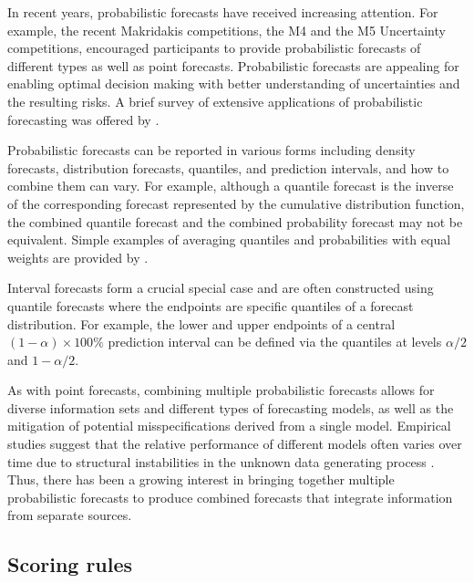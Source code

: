 \documentclass[a4paper,11pt]{article}
\begin{document}
In recent years, probabilistic forecasts have received increasing attention. For example, the recent Makridakis competitions, the M4 and the M5 Uncertainty \citep{Makridakis2020-lz} competitions, encouraged participants to provide probabilistic forecasts of different types as well as point forecasts. Probabilistic forecasts are appealing for enabling optimal decision making with better understanding of uncertainties and the resulting risks. A brief survey of extensive applications of probabilistic forecasting was offered by \citet{Gneiting2014-tz}.

Probabilistic forecasts can be reported in various forms including density forecasts, distribution forecasts, quantiles, and prediction intervals, and how to combine them can vary. For example, although a quantile forecast is the inverse of the corresponding forecast represented by the cumulative distribution function, the combined quantile forecast and the combined probability forecast may not be equivalent. Simple examples of averaging quantiles and probabilities with equal weights are provided by \citet{Lichtendahl2013-rt}.

Interval forecasts form a crucial special case and are often constructed using quantile forecasts where the endpoints are specific quantiles of a forecast distribution. For example, the lower and upper endpoints of a central $(1-\alpha)\times 100\%$ prediction interval can be defined via the quantiles at levels $\alpha/2$ and $1-\alpha/2$.

As with point forecasts, combining multiple probabilistic forecasts allows for diverse information sets and different types of forecasting models, as well as the mitigation of potential misspecifications derived from a single model. Empirical studies suggest that the relative performance of different models often varies over time due to structural instabilities in the unknown data generating process \citep[e.g.,][]{Billio2013-sg}. Thus, there has been a growing interest in bringing together multiple probabilistic forecasts to produce combined forecasts that integrate information from separate sources.

\subsection{Scoring rules}
\label{sec:issues}
\end{document}
